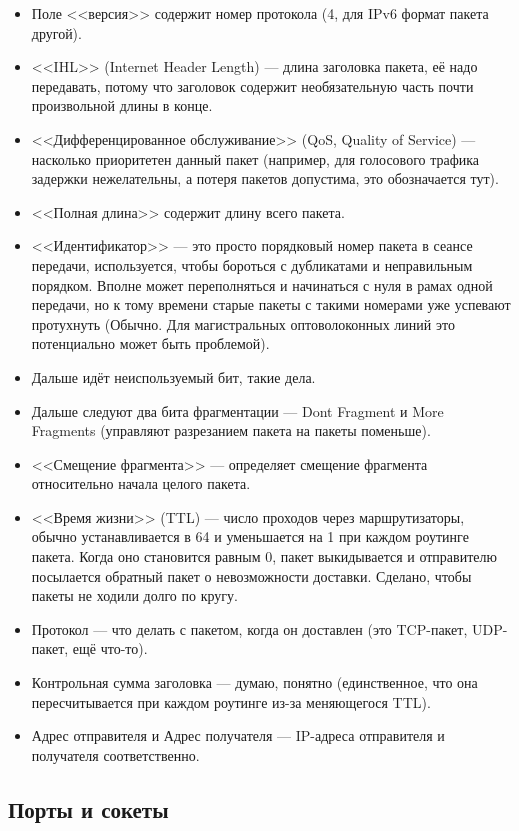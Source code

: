 \documentclass{../../text-style}
\begin{document}
\begin{itemize}
    \item Поле <<версия>> содержит номер протокола (4, для IPv6 формат пакета другой).
    \item <<IHL>> (Internet Header Length) --- длина заголовка пакета, её надо передавать, потому что заголовок содержит необязательную часть почти произвольной длины в конце.
    \item <<Дифференцированное обслуживание>> (QoS, Quality of Service) --- насколько приоритетен данный пакет (например, для голосового трафика задержки нежелательны, а потеря пакетов допустима, это обозначается тут).
    \item <<Полная длина>> содержит длину всего пакета.
    \item <<Идентификатор>> --- это просто порядковый номер пакета в сеансе передачи, используется, чтобы бороться с дубликатами и неправильным порядком. Вполне может переполняться и начинаться с нуля в рамах одной передачи, но к тому времени старые пакеты с такими номерами уже успевают протухнуть (Обычно. Для магистральных оптоволоконных линий это потенциально может быть проблемой).
    \item Дальше идёт неиспользуемый бит, такие дела.
    \item Дальше следуют два бита фрагментации --- Dont Fragment и More Fragments (управляют разрезанием пакета на пакеты поменьше).
    \item <<Смещение фрагмента>> --- определяет смещение фрагмента относительно начала целого пакета.
    \item <<Время жизни>> (TTL) --- число проходов через маршрутизаторы, обычно устанавливается в 64 и уменьшается на 1 при каждом роутинге пакета. Когда оно становится равным 0, пакет выкидывается и отправителю посылается обратный пакет о невозможности доставки. Сделано, чтобы пакеты не ходили долго по кругу.
    \item Протокол --- что делать с пакетом, когда он доставлен (это TCP-пакет, UDP-пакет, ещё что-то).
    \item Контрольная сумма заголовка --- думаю, понятно (единственное, что она пересчитывается при каждом роутинге из-за меняющегося TTL).
    \item Адрес отправителя и Адрес получателя --- IP-адреса отправителя и получателя соответственно.
\end{itemize}

\subsection{Порты и сокеты}
\end{document}
